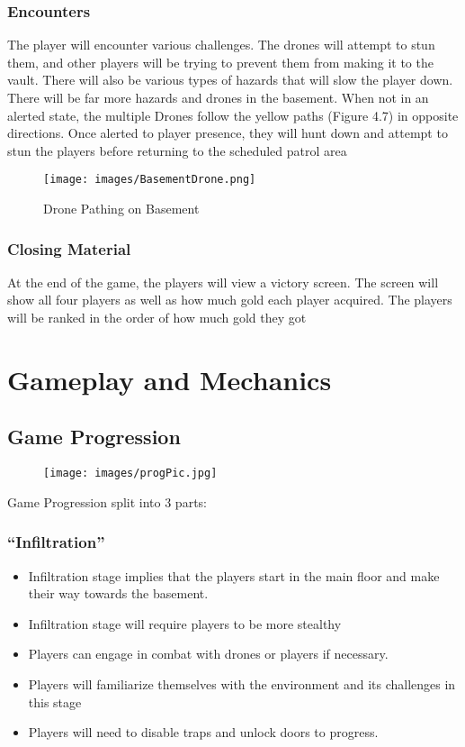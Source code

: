 \documentclass[10pt]{report}
\begin{document}
\subsection{Encounters}

The player will encounter various challenges. The drones will attempt to stun them, and other players will be trying to prevent them from making it to the vault. There will also be various types of hazards that will slow the player down. There will be far more hazards and drones in the basement. When not in an alerted state, the multiple Drones follow the yellow paths (Figure 4.7) in opposite directions. Once alerted to player presence, they will hunt down and attempt to stun the players before returning to the scheduled patrol area

\begin{figure}[H]
    \centering
    \texttt{[image: images/BasementDrone.png]}
    \caption{Drone Pathing on Basement}
\end{figure}

\subsection{Closing Material}

At the end of the game, the players will view a victory screen. The screen will show all four players as well as how much gold each player acquired. The players will be ranked in the order of how much gold they got

\chapter{Gameplay and Mechanics}

\section{Game Progression}

\begin{figure}[H]
    \centering
    \texttt{[image: images/progPic.jpg]}
    \caption{}
\end{figure}

Game Progression split into 3 parts:

\subsection{``Infiltration''}

\begin{itemize}
    \item Infiltration stage implies that the players start in the main floor and make their way towards the basement.
    \item Infiltration stage will require players to be more stealthy
    \item Players can engage in combat with drones or players if necessary.
    \item Players will familiarize themselves with the environment and its challenges in this stage
    \item Players will need to disable traps and unlock doors to progress.    
\end{itemize}
\end{document}
